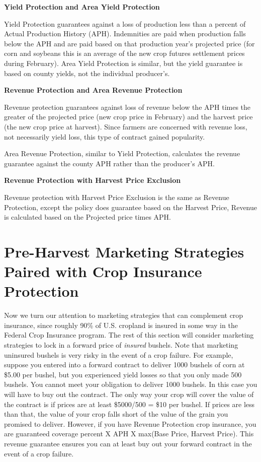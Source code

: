 \documentclass[
]{book}
\begin{document}
\textbf{Yield Protection and Area Yield Protection}

Yield Protection guarantees against a loss of production less than a percent of Actual Production History (APH). Indemnities are paid when production falls below the APH and are paid based on that production year's projected price (for corn and soybeans this is an average of the new crop futures settlement prices during February). Area Yield Protection is similar, but the yield guarantee is based on county yields, not the individual producer's.

\textbf{Revenue Protection and Area Revenue Protection}

Revenue protection guarantees against loss of revenue below the APH times the greater of the projected price (new crop price in February) and the harvest price (the new crop price at harvest). Since farmers are concerned with revenue loss, not necessarily yield loss, this type of contract gained popularity.

Area Revenue Protection, similar to Yield Protection, calculates the revenue guarantee against the county APH rather than the producer's APH.

\textbf{Revenue Protection with Harvest Price Exclusion}

Revenue protection with Harvest Price Exclusion is the same as Revenue Protection, except the policy does guarantee based on the Harvest Price, Revenue is calculated based on the Projected price times APH.

\hypertarget{pre-harvest-marketing-strategies-paired-with-crop-insurance-protection}{%
\section{Pre-Harvest Marketing Strategies Paired with Crop Insurance Protection}\label{pre-harvest-marketing-strategies-paired-with-crop-insurance-protection}}

Now we turn our attention to marketing strategies that can complement crop insurance, since roughly 90\% of U.S. cropland is insured in some way in the Federal Crop Insurance program\citep{farrin_how_2016}. The rest of this section will consider marketing strategies to lock in a forward price of \emph{insured} bushels. Note that marketing uninsured bushels is very risky in the event of a crop failure. For example, suppose you entered into a forward contract to deliver 1000 bushels of corn at \$5.00 per bushel, but you experienced yield losses so that you only made 500 bushels. You cannot meet your obligation to deliver 1000 bushels. In this case you will have to buy out the contract. The only way your crop will cover the value of the contract is if prices are at least \$5000/500 = \$10 per bushel. If prices are less than that, the value of your crop falls short of the value of the grain you promised to deliver. However, if you have Revenue Protection crop insurance, you are guaranteed coverage percent X APH X max(Base Price, Harvest Price). This revenue guarantee ensures you can at least buy out your forward contract in the event of a crop failure.
\end{document}
